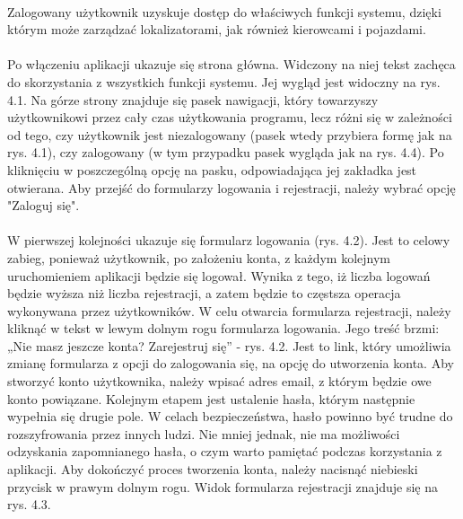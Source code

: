 \paragraph{}
Zalogowany użytkownik uzyskuje dostęp do właściwych funkcji systemu, dzięki którym może zarządzać lokalizatorami, jak również kierowcami i pojazdami.

\paragraph{}
Po włączeniu aplikacji ukazuje się strona główna. Widczony na niej tekst zachęca do skorzystania z wszystkich funkcji systemu. Jej wygląd jest widoczny na rys. 4.1. Na górze strony znajduje się pasek nawigacji, który towarzyszy użytkownikowi przez cały czas użytkowania programu, lecz różni się w zależności od tego, czy użytkownik jest niezalogowany (pasek wtedy przybiera formę jak na rys. 4.1), czy zalogowany (w tym przypadku pasek wygląda jak na rys. 4.4). Po kliknięciu w poszczególną opcję na pasku, odpowiadająca jej zakładka jest otwierana. Aby przejść do formularzy logowania i rejestracji, należy wybrać opcję "Zaloguj się".

\paragraph{}
W pierwszej kolejności ukazuje się formularz logowania (rys. 4.2). Jest to celowy zabieg, ponieważ użytkownik, po założeniu konta, z każdym kolejnym uruchomieniem aplikacji będzie się logował. Wynika z tego, iż liczba logowań będzie wyższa niż liczba rejestracji, a zatem będzie to częstsza operacja wykonywana przez użytkowników. W celu otwarcia formularza rejestracji, należy kliknąć w tekst w lewym dolnym rogu formularza logowania. Jego treść brzmi: „Nie masz jeszcze konta? Zarejestruj się” - rys. 4.2. Jest to link, który umożliwia zmianę formularza z opcji do zalogowania się, na opcję do utworzenia konta. Aby stworzyć konto użytkownika, należy wpisać adres email, z którym będzie owe konto powiązane. Kolejnym etapem jest ustalenie hasła, którym następnie wypełnia się drugie pole. W celach bezpieczeństwa, hasło powinno być trudne do rozszyfrowania przez innych ludzi. Nie mniej jednak, nie ma możliwości odzyskania zapomnianego hasła, o czym warto pamiętać podczas korzystania z aplikacji. Aby dokończyć proces tworzenia konta, należy nacisnąć niebieski przycisk w prawym dolnym rogu. Widok formularza rejestracji znajduje się na rys. 4.3.

